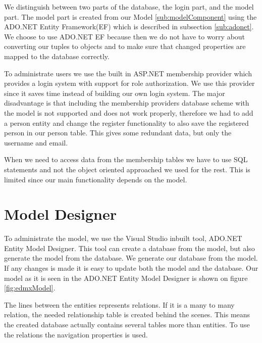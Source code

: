 \label{sec:databasestructure}

We distinguish between two parts of the database, the login part, and the model part. 
The model part is created from our Model \ref{sub:modelComponent} using the ADO.NET Entity Framework(EF) which is described in subsection \ref{sub:adonet}. 
We choose to use ADO.NET EF because then we do not have to worry about converting our tuples to objects and to make sure that changed properties are mapped to the database correctly.  

To administrate users we use the built in ASP.NET membership provider which provides a login system with support for role authorization. 
We use this provider since it saves time instead of building our own login system. 
The major disadvantage is that including the membership providers database scheme with the model is not supported and does not work properly, therefore we had to add a person entity and change the register functionality to also save the registered person in our person table. 
This gives some redundant data, but only the username and email. 

When we need to access data from the membership tables we have to use SQL statements and not the object oriented approached we used for the rest. 
This is limited since our main functionality depends on the model. 

\section{Model Designer}
To administrate the model, we use the Visual Studio inbuilt tool, ADO.NET Entity Model Designer. This tool can create a database from the model, but also generate the model from the database. We generate our database from the model. If any changes is made it is easy to update both the model and the database. 
Our model as it is seen in the ADO.NET Entity Model Designer is shown on figure \ref{fig:edmxModel}.

The lines between the entities represents relations. If it is a many to many relation, the needed relationship table is created behind the scenes. This means the created database actually contains several tables more than entities. To use the relations the navigation properties is used. \vspace{2mm}

